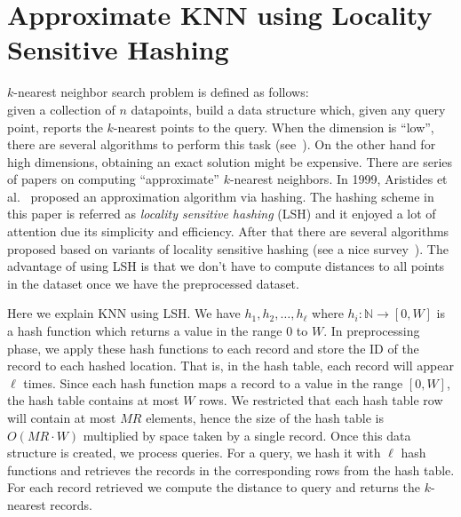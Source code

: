 \section{Approximate KNN using Locality Sensitive Hashing}
\label{sec:lsh}
$k$-nearest neighbor search problem is defined as follows:\\
given a collection of $n$ datapoints, build a data structure which, given any query point, reports the $k$-nearest points to the query. 
When the dimension is ``low'', there are several algorithms to perform this task (see~\cite{samet2006foundations}). 
On the other hand for high dimensions, obtaining an exact solution might be expensive. 
There are series of papers on computing ``approximate'' $k$-nearest neighbors. 
In 1999, Aristides et al.~\cite{gionis1999similarity} proposed an approximation algorithm via hashing.
The hashing scheme in this paper is referred as \emph{locality sensitive hashing} (LSH) and it enjoyed a lot of attention due its simplicity and efficiency. 
After that there are several algorithms proposed based on variants of locality sensitive hashing (see a nice survey~\cite{andoni2006near}).
The advantage of using LSH is that we don't have to compute distances to all points in the dataset once we have the preprocessed dataset. 

Here we explain KNN using LSH. 
We have $h_1, h_2, \ldots, h_\ell$ where $h_i: \mathbb{N} \to [0, W]$ is a hash function which returns a value in the range $0$ to $W$.
In preprocessing phase, we apply these hash functions to each record and store the ID of the record to each hashed location. 
That is, in the hash table, each record will appear $\ell$ times. 
Since each hash function maps a record to a value in the range $[0, W]$, the hash table contains at most $W$ rows. 
We restricted that each hash table row will contain at most $MR$ elements, hence the size of the hash table is $O(MR \cdot W)$ multiplied by space taken by a single record. 
Once this data structure is created, we process queries. 
For a query, we hash it with $\ell$ hash functions and retrieves the records in the corresponding rows from the hash table. 
For each record retrieved we compute the distance to query and returns the $k$-nearest records. 


